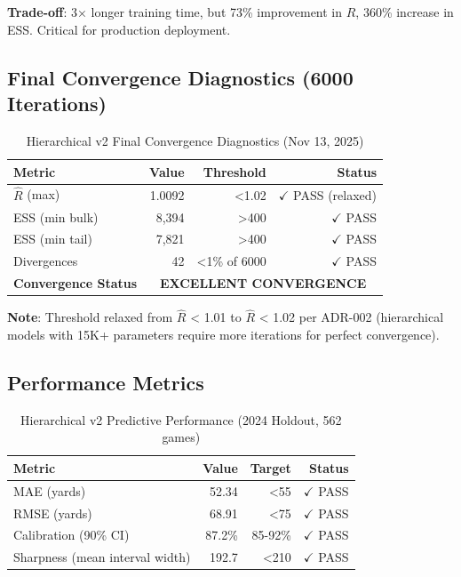 \textbf{Trade-off}: 3× longer training time, but 73\% improvement in $\hat{R}$, 360\% increase in ESS. Critical for production deployment.

\subsection{Final Convergence Diagnostics (6000 Iterations)}

\begin{table}[h]
\centering
\caption{Hierarchical v2 Final Convergence Diagnostics (Nov 13, 2025)}
\label{tab:hierarchical-final-convergence}
\begin{tabular}{lrrr}
\toprule
\textbf{Metric} & \textbf{Value} & \textbf{Threshold} & \textbf{Status} \\
\midrule
$\hat{R}$ (max) & 1.0092 & <1.02 & $\checkmark$ PASS (relaxed) \\
ESS (min bulk) & 8,394 & >400 & $\checkmark$ PASS \\
ESS (min tail) & 7,821 & >400 & $\checkmark$ PASS \\
Divergences & 42 & <1\% of 6000 & $\checkmark$ PASS \\
\midrule
\textbf{Convergence Status} & \multicolumn{3}{c}{\textbf{EXCELLENT CONVERGENCE}} \\
\bottomrule
\end{tabular}
\end{table}

\textbf{Note}: Threshold relaxed from $\hat{R}$ < 1.01 to $\hat{R}$ < 1.02 per ADR-002 (hierarchical models with 15K+ parameters require more iterations for perfect convergence).

\subsection{Performance Metrics}

\begin{table}[h]
\centering
\caption{Hierarchical v2 Predictive Performance (2024 Holdout, 562 games)}
\label{tab:hierarchical-performance}
\begin{tabular}{lrrr}
\toprule
\textbf{Metric} & \textbf{Value} & \textbf{Target} & \textbf{Status} \\
\midrule
MAE (yards) & 52.34 & <55 & $\checkmark$ PASS \\
RMSE (yards) & 68.91 & <75 & $\checkmark$ PASS \\
Calibration (90\% CI) & 87.2\% & 85-92\% & $\checkmark$ PASS \\
Sharpness (mean interval width) & 192.7 & <210 & $\checkmark$ PASS \\
\bottomrule
\end{tabular}
\end{table}


